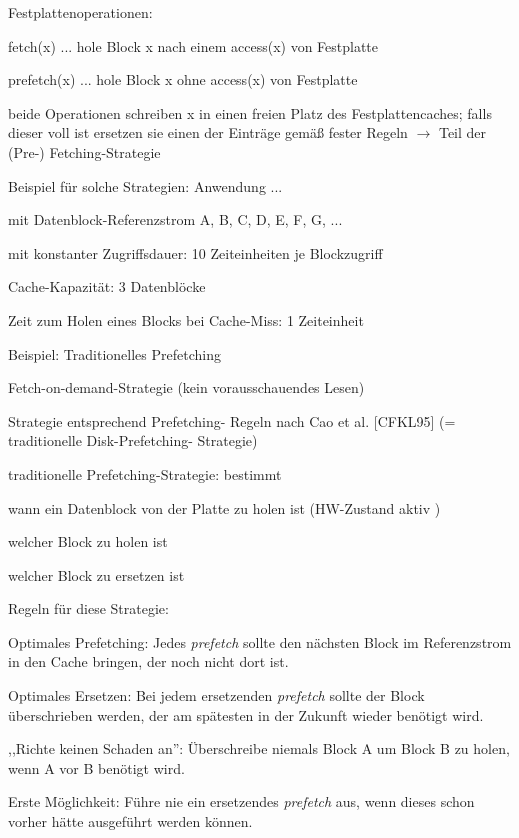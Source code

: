 \documentclass[a4paper]{article}
\begin{document}
\begin{multicols}{3}
\begin{itemize*}
        Festplattenoperationen:
        \begin{itemize*}
            \item fetch(x) ... hole Block x nach einem access(x) von Festplatte
            \item prefetch(x) ... hole Block x ohne access(x) von Festplatte
            \item beide Operationen schreiben x in einen freien Platz des Festplattencaches; falls dieser voll ist ersetzen sie einen der Einträge gemäß fester Regeln $\rightarrow$ Teil der (Pre-) Fetching-Strategie
        \end{itemize*}
        \item
        Beispiel für solche Strategien: Anwendung ...
        \begin{itemize*}
            \item mit Datenblock-Referenzstrom A, B, C, D, E, F, G, ...
            \item mit konstanter Zugriffsdauer: 10 Zeiteinheiten je Blockzugriff
            \item Cache-Kapazität: 3 Datenblöcke
            \item Zeit zum Holen eines Blocks bei Cache-Miss: 1 Zeiteinheit
        \end{itemize*}
        \item
        Beispiel: Traditionelles Prefetching
        \begin{itemize*}
            \item Fetch-on-demand-Strategie (kein vorausschauendes Lesen)
            \item Strategie entsprechend Prefetching- Regeln nach Cao et al. {[}CFKL95{]} (= traditionelle Disk-Prefetching- Strategie)
            \item traditionelle Prefetching-Strategie: bestimmt \begin{itemize*} \item wann ein Datenblock von der Platte zu holen ist (HW-Zustand aktiv ) \item welcher Block zu holen ist \item welcher Block zu ersetzen ist \end{itemize*}
            \item Regeln für diese Strategie: \begin{enumerate*} \item Optimales Prefetching: Jedes \emph{prefetch} sollte den nächsten Block im Referenzstrom in den Cache bringen, der noch nicht dort ist. \item Optimales Ersetzen: Bei jedem ersetzenden \emph{prefetch} sollte der Block überschrieben werden, der am spätesten in der Zukunft wieder benötigt wird. \item ,,Richte keinen Schaden an'': Überschreibe niemals Block A um Block B zu holen, wenn A vor B benötigt wird. \item Erste Möglichkeit: Führe nie ein ersetzendes \emph{prefetch} aus, wenn dieses schon vorher hätte ausgeführt werden können. \end{enumerate*}

\end{itemize*}
\end{itemize*}
\end{multicols}
\end{document}

